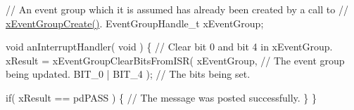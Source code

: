 \begin{DoxyPre}  // An event group which it is assumed has already been created by a call to
  // \hyperlink{event__groups_8c_a2e8622ce280fff2f60ad867dff0a4519}{xEventGroupCreate()}.
  EventGroupHandle\_t xEventGroup;\end{DoxyPre}



\begin{DoxyPre}  void anInterruptHandler( void )
  \{
    // Clear bit 0 and bit 4 in xEventGroup.
    xResult = xEventGroupClearBitsFromISR(
                        xEventGroup,     // The event group being updated.
                        BIT\_0 | BIT\_4 ); // The bits being set.\end{DoxyPre}



\begin{DoxyPre}    if( xResult == pdPASS )
    \{
        // The message was posted successfully.
    \}
 \}
  \end{DoxyPre}
 